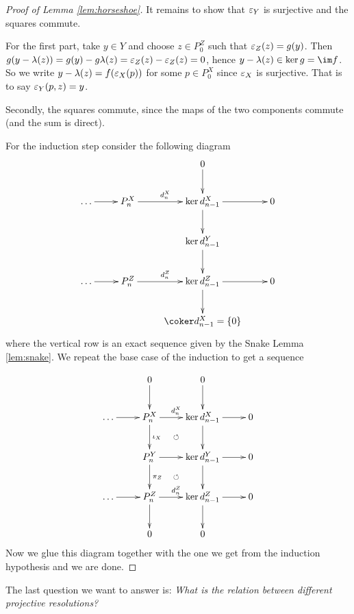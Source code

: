 \documentclass[twoside = false,	%
		headsepline,		%
		parskip = true,
		]{scrbook}						%
\begin{document}
\begin{proof}[Proof of Lemma \ref{lem:horseshoe}]
       It remains to show that $\varepsilon_Y$ is surjective and the squares commute.
       
       For the first part, take $y \in Y$ and choose $z \in P_0^Z$ such that $\varepsilon_Z(z) = g(y)$. Then $g(y - \lambda (z)) = g(y) - g \lambda (z) = \varepsilon_Z(z) - \varepsilon_Z(z) = 0$, hence $y - \lambda(z) \in \ker g = \im f$. So we write $y-\lambda(z) = f(\varepsilon_X(p))$ for some $p \in P_0^X$ since $\varepsilon_X$ is surjective. That is to say $\varepsilon_Y(p,z) = y$.

       Secondly, the squares commute, since the maps of the two components commute (and the sum is direct).

        For the induction step consider the following diagram
        \begin{equation*}
        \xymatrix {
                        &                          & 0 \ar[d] \\
            \dots \ar[r] & P_{n}^X \ar[r]^{d_n^X} & \ker d_{n-1}^X \ar[r] \ar[d]& 0 \\
            & & \ker d_{n-1}^Y \ar[d] \\
            \dots \ar[r] & P_{n}^Z \ar[r]^{d_n^Z} & \ker d_{n-1}^Z \ar[r] \ar[d] & 0 \\
            & & \coker d_{n-1}^X = \{0\}
        }
        \end{equation*}
        where the vertical row is an exact sequence given by the Snake Lemma \ref{lem:snake}. We repeat the base case of the induction to get a sequence
        
        \begin{equation*}
        \xymatrix {
                        &  0 \ar[d] & 0 \ar[d] \\
            \dots \ar[r] & P_{n}^X \ar[d]^{\iota_{X}} \ar[r]^{d_n^X} & \ker d_{n-1}^X \ar[r] \ar[d]& 0 \\
            & P_{n}^Y \ar@{}[ur]|{\circlearrowleft} \ar[r] \ar[d]^{\pi_Z}& \ker d_{n-1}^Y \ar[d] \ar[r] & 0 \\
            \dots \ar[r] & P_{n}^Z \ar[r]^{d_n^Z} \ar@{}[ur]|{\circlearrowleft} \ar[d] & \ker d_{n-1}^Z \ar[r] \ar[d] & 0 \\
            & 0 &  0
        }
        \end{equation*}
        Now we glue this diagram together with the one we get from the induction hypothesis and we are done.
    \end{proof}

    The last question we want to answer is: \textit{What is the relation between different projective resolutions?}
\end{document}
